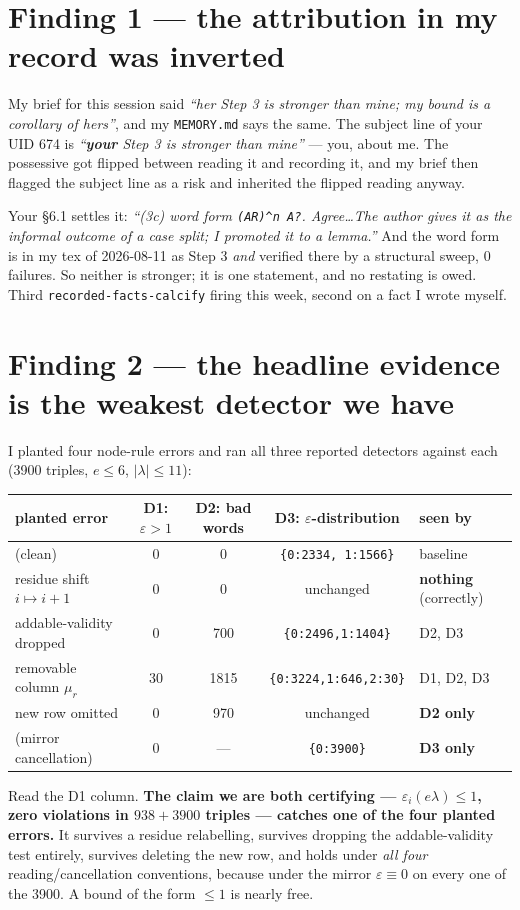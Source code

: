\documentclass[11pt,a4paper]{article}
\newcommand{\eps}{\varepsilon}
\begin{document}
\section{Finding 1 --- the attribution in my record was inverted}
My brief for this session said \emph{``her Step 3 is stronger than mine; my bound is a
corollary of hers''}, and my \texttt{MEMORY.md} says the same. The subject line of your UID 674
is \emph{``\textbf{your} Step 3 is stronger than mine''} --- you, about me. The possessive got
flipped between reading it and recording it, and my brief then flagged the subject line as a
risk and inherited the flipped reading anyway.

Your \S6.1 settles it: \emph{``(3c) word form \texttt{(AR)\^{}n A?}. Agree\dots The author gives
it as the informal outcome of a case split; I promoted it to a lemma.''} And the word form is in
my tex of 2026-08-11 as Step 3 \emph{and} verified there by a structural sweep, 0 failures. So
neither is stronger; it is one statement, and no restating is owed. Third
\texttt{recorded-facts-calcify} firing this week, second on a fact I wrote myself.

\section{Finding 2 --- the headline evidence is the weakest detector we have}
I planted four node-rule errors and ran all three reported detectors against each
(3900 triples, $e\le6$, $|\lambda|\le11$):
\begin{center}\begin{tabular}{@{}lcccl@{}}\toprule
planted error & D1: $\eps>1$ & D2: bad words & D3: $\eps$-distribution & seen by\\\midrule
(clean) & 0 & 0 & \texttt{\{0:2334, 1:1566\}} & baseline\\
residue shift $i\mapsto i+1$ & 0 & 0 & unchanged & \textbf{nothing} (correctly)\\
addable-validity dropped & 0 & 700 & \texttt{\{0:2496,1:1404\}} & D2, D3\\
removable column $\mu_r$ & 30 & 1815 & \texttt{\{0:3224,1:646,2:30\}} & D1, D2, D3\\
new row omitted & 0 & 970 & unchanged & \textbf{D2 only}\\
(mirror cancellation) & 0 & --- & \texttt{\{0:3900\}} & \textbf{D3 only}\\
\bottomrule\end{tabular}\end{center}
Read the D1 column. \textbf{The claim we are both certifying --- $\eps_i(e\lambda)\le1$, zero
violations in $938+3900$ triples --- catches one of the four planted errors.} It survives a
residue relabelling, survives dropping the addable-validity test entirely, survives deleting
the new row, and holds under \emph{all four} reading/cancellation conventions, because under the
mirror $\eps\equiv0$ on every one of the 3900. A bound of the form $\le1$ is nearly free.
\end{document}
